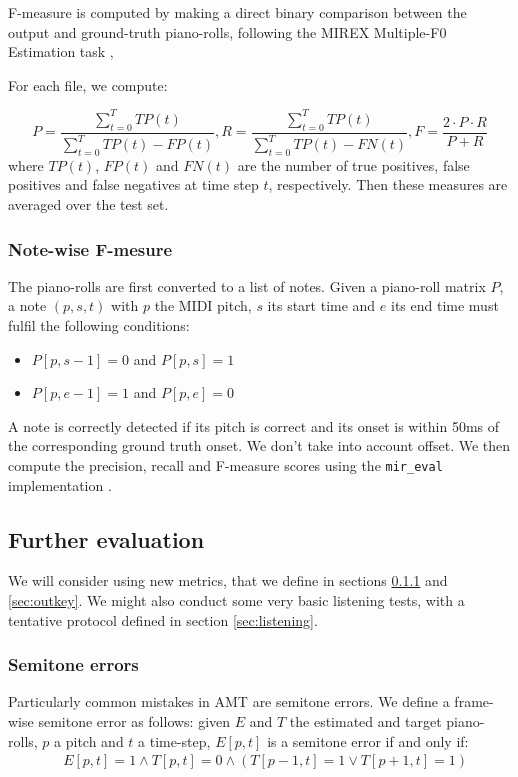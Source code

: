 \documentclass{article}
\begin{document}
F-measure is computed by making a direct binary comparison between the output and ground-truth piano-rolls, following the MIREX Multiple-F0 Estimation task \citep{Bay2009}, 

For each file, we compute:

\[
P = \frac{\sum_{t=0}^{T}TP(t)}{\sum_{t=0}^{T}TP(t) - FP(t)} ,
R = \frac{\sum_{t=0}^{T}TP(t)}{\sum_{t=0}^{T}TP(t) - FN(t)} ,
F = \frac{2 \cdot P \cdot R}{P + R} 
\]
where $TP(t)$, $FP(t)$ and $FN(t)$ are the number of true positives, false positives and false negatives at time step $t$, respectively. 
Then these measures are averaged over the test set.

\subsubsection{Note-wise F-mesure}

The piano-rolls are first converted to a list of notes.
Given a piano-roll matrix $P$, a note $(p,s,t)$ with $p$ the MIDI pitch, $s$ its start time and $e$ its end time must fulfil the following conditions:

\begin{itemize}
\item $P[p,s-1] = 0$ and $P[p,s] = 1$
\item $P[p,e-1] = 1$ and $P[p,e] = 0$
\end{itemize}

A note is correctly detected if its pitch is correct and its onset is within 50ms of the corresponding ground truth onset. We don't take into account offset.
We then compute the precision, recall and F-measure scores using the \texttt{mir\_eval} implementation \citep{raffel2014mireval}.

\subsection{Further evaluation}

We will consider using new metrics, that we define in sections \ref{sec:semitone} and \ref{sec:outkey}.
We might also conduct some very basic listening tests, with a tentative protocol defined in section \ref{sec:listening}.
 
\subsubsection{Semitone errors}
\label{sec:semitone} 


Particularly common mistakes in AMT are semitone errors.
We define a frame-wise semitone error as follows: given $E$ and $T$ the estimated and target piano-rolls, $p$ a pitch and $t$ a time-step, $E[p,t]$ is a semitone error if and only if: 
\vspace{-0.2cm}
\begin{align*}
&E[p,t]= 1 \wedge T[p,t]= 0 \wedge
(T[p-1,t]= 1 \vee T[p+1,t]= 1)
\end{align*}
\end{document}
